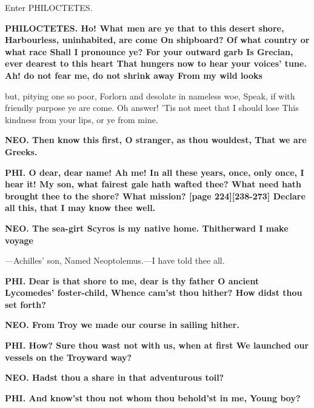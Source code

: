 \documentclass[11pt,letter]{book}
\begin{document}
\par  Enter PHILOCTETES.

\par \textbf{PHILOCTETES. Ho! What men are ye that to this desert shore, Harbourless, uninhabited, are come On shipboard? Of what country or what race Shall I pronounce ye? For your outward garb Is Grecian, ever dearest to this heart That hungers now to hear your voices’ tune. Ah! do not fear me, do not shrink away From my wild looks}
\par   but, pitying one so poor, Forlorn and desolate in nameless woe, Speak, if with friendly purpose ye are come. Oh answer! ’Tis not meet that I should lose This kindness from your lips, or ye from mine.

\par \textbf{NEO. Then know this first, O stranger, as thou wouldest, That we are Greeks.}
\par 

\par \textbf{PHI. O dear, dear name! Ah me! In all these years, once, only once, I hear it! My son, what fairest gale hath wafted thee? What need hath brought thee to the shore? What mission? [page 224][238-273] Declare all this, that I may know thee well.}
\par 

\par \textbf{NEO. The sea-girt Scyros is my native home. Thitherward I make voyage}
\par  —Achilles’ son, Named Neoptolemus.—I have told thee all.

\par \textbf{PHI. Dear is that shore to me, dear is thy father O ancient Lycomedes’ foster-child, Whence cam’st thou hither? How didst thou set forth?}
\par 

\par \textbf{NEO. From Troy we made our course in sailing hither.}
\par 

\par \textbf{PHI. How? Sure thou wast not with us, when at first We launched our vessels on the Troyward way?}
\par 

\par \textbf{NEO. Hadst thou a share in that adventurous toil?}
\par 

\par \textbf{PHI. And know’st thou not whom thou behold’st in me, Young boy?}
\par 
\end{document}
